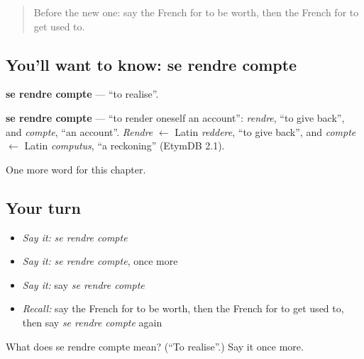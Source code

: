 \label{lesson:FR-C239-rendre-compte}



\begin{quote}
Before the new one: say the French for to be worth, then the French for to get used to.
\end{quote}

\subsection*{You'll want to know: se rendre compte}
\textbf{se rendre compte} — \textquotedblleft{}to realise\textquotedblright{}.

\begin{cousinweb}
\textbf{se rendre compte} — \textquotedblleft{}to render oneself an account\textquotedblright{}: \emph{rendre}, \textquotedblleft{}to give back\textquotedblright{}, and \emph{compte}, \textquotedblleft{}an account\textquotedblright{}. \emph{Rendre} $\leftarrow$ Latin \emph{reddere}, \textquotedblleft{}to give back\textquotedblright{}, and \emph{compte} $\leftarrow$ Latin \emph{computus}, \textquotedblleft{}a reckoning\textquotedblright{} (EtymDB 2.1).
\end{cousinweb}

\begin{grammarlens}[title={What you've built}]
One more word for this chapter.
\end{grammarlens}

\subsection*{Your turn}
\begin{itemize}
\raggedright
  \item \emph{Say it:} \emph{se rendre compte}
  \item \emph{Say it:} \emph{se rendre compte}, once more
  \item \emph{Say it:} say \emph{se rendre compte}
  \item \emph{Recall:} say the French for to be worth, then the French for to get used to, then say \emph{se rendre compte} again
\end{itemize}

\begin{tcolorbox}[breakable,colback=teal!4,colframe=teal!35!black,title={Before you move on}]
What does se rendre compte mean? (\textquotedblleft{}To realise\textquotedblright{}.) Say it once more.
\end{tcolorbox}
